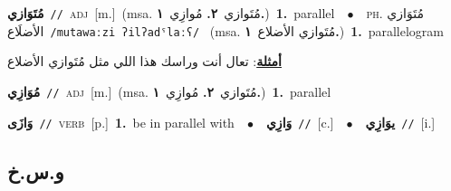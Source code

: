 \documentclass[10pt,a4paper,twoside]{article} %
\begin{document}
\begin{multicols}{2}
{\setlength\topsep{0pt}\textbf{\foreignlanguage{arabic}{مُتَوَازي}}\ {\color{gray}\texttt{//}\color{black}}\ \textsc{adj}\ [m.]\ \color{gray}(msa. \foreignlanguage{arabic}{مُتَوازي}~\foreignlanguage{arabic}{\textbf{٢.}}  \foreignlanguage{arabic}{مُوازِي}~\foreignlanguage{arabic}{\textbf{١.}})\color{black}\ \textbf{1.}~parallel\ \ $\bullet$\ \ \textsc{ph.} \color{gray} \foreignlanguage{arabic}{مُتَوَازي الأضلَاع}\color{black}\ {\color{gray}\texttt{/{\sffamily mutawaːzi ʔilʔadˤlaːʕ}/}\color{black}}\ \color{gray} (msa. \foreignlanguage{arabic}{مُتَوازي الأضلاع}~\foreignlanguage{arabic}{\textbf{١.}})\color{black}\ \textbf{1.}~parallelogram\  \begin{flushright}\color{gray}\foreignlanguage{arabic}{\textbf{\underline{\foreignlanguage{arabic}{أمثلة}}}: تعال أنت وراسك هذا اللي مثل مُتَوازي الأضلاع}\end{flushright}\color{black}} \vspace{2mm}

{\setlength\topsep{0pt}\textbf{\foreignlanguage{arabic}{مُوَازِي}}\ {\color{gray}\texttt{//}\color{black}}\ \textsc{adj}\ [m.]\ \color{gray}(msa. \foreignlanguage{arabic}{مُتَوازي}~\foreignlanguage{arabic}{\textbf{٢.}}  \foreignlanguage{arabic}{مُوازِي}~\foreignlanguage{arabic}{\textbf{١.}})\color{black}\ \textbf{1.}~parallel\ } \vspace{2mm}

{\setlength\topsep{0pt}\textbf{\foreignlanguage{arabic}{وَازَى}}\ {\color{gray}\texttt{//}\color{black}}\ \textsc{verb}\ [p.]\ \textbf{1.}~be in parallel with\ \ $\bullet$\ \ \setlength\topsep{0pt}\textbf{\foreignlanguage{arabic}{وَازِي}}\ {\color{gray}\texttt{//}\color{black}}\ [c.]\ \ $\bullet$\ \ \setlength\topsep{0pt}\textbf{\foreignlanguage{arabic}{يوَازِي}}\ {\color{gray}\texttt{//}\color{black}}\ [i.]\ } \vspace{2mm}

\vspace{-3mm}
\subsection*{\color{blue}\foreignlanguage{arabic}{و.س.خ}\color{blue}{}} 


\end{multicols}
\end{document}
